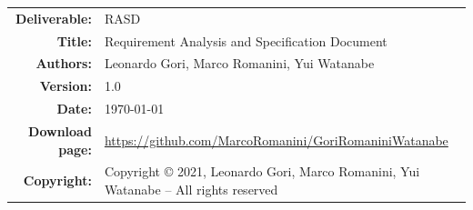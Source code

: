

\begin{table}[H]
    \setlength\arrayrulewidth{1pt}
    \centering
    \begin{tabular}{rl}
        \hline
        \textbf{Deliverable:} & RASD\\
        \textbf{Title:} & Requirement Analysis and Specification Document \\
        \textbf{Authors:} & Leonardo Gori, Marco Romanini, Yui Watanabe \\
        \textbf{Version:} & 1.0 \\ 
        \textbf{Date:} & \today \\
        \textbf{Download page:} & \url{https://github.com/MarcoRomanini/GoriRomaniniWatanabe} \\
        \textbf{Copyright:} & Copyright © 2021, Leonardo Gori, Marco Romanini, Yui Watanabe – All rights reserved \\
        \hline
    \end{tabular}
\end{table}

\setcounter{page}{2}


\newpage
{}
\tableofcontents
\newpage
{}
\listoffigures
{}
\listoftables

\clearpage
{}
\label{sect:introduction}


